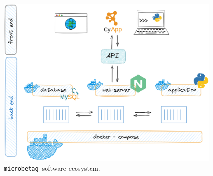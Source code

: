 \documentclass[sn-mathphys,Numbered]{sn-jnl}  %
\theoremstyle{thmstyleone}%
\theoremstyle{thmstyletwo}%
\theoremstyle{thmstylethree}%
\newcommand{\microbetag}{\texttt{microbetag }}
\begin{document}
\begin{appendices}
        \begin{figure}[H]
            \includegraphics*[width=0.9\columnwidth]{figs/architecture.png}
            \caption{
                \microbetag software ecosystem.
            }
        \label{fig:s1}
        \end{figure}





\end{appendices}
\end{document}
